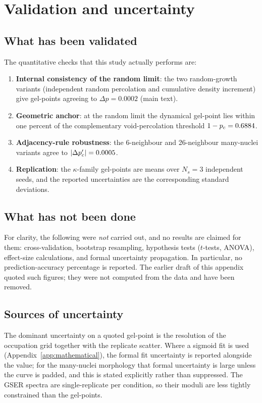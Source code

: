 \section{Validation and uncertainty}
\label{app:validation}

\subsection{What has been validated}

The quantitative checks that this study actually performs are:

\begin{enumerate}
    \item \textbf{Internal consistency of the random limit}: the two random-growth variants (independent random percolation and cumulative density increment) give gel-points agreeing to $\Delta p = 0.0002$ (main text).
    \item \textbf{Geometric anchor}: at the random limit the dynamical gel-point lies within one percent of the complementary void-percolation threshold $1 - p_c = 0.6884$.
    \item \textbf{Adjacency-rule robustness}: the 6-neighbour and 26-neighbour many-nuclei variants agree to $|\Delta p_c'| = 0.0005$.
    \item \textbf{Replication}: the $\kappa$-family gel-points are means over $N_s = 3$ independent seeds, and the reported uncertainties are the corresponding standard deviations.
\end{enumerate}

\subsection{What has not been done}

For clarity, the following were \emph{not} carried out, and no results are claimed for them: cross-validation, bootstrap resampling, hypothesis tests ($t$-tests, ANOVA), effect-size calculations, and formal uncertainty propagation. In particular, no prediction-accuracy percentage is reported. The earlier draft of this appendix quoted such figures; they were not computed from the data and have been removed.

\subsection{Sources of uncertainty}

The dominant uncertainty on a quoted gel-point is the resolution of the occupation grid together with the replicate scatter. Where a sigmoid fit is used (Appendix~\ref{app:mathematical}), the formal fit uncertainty is reported alongside the value; for the many-nuclei morphology that formal uncertainty is large unless the curve is padded, and this is stated explicitly rather than suppressed. The GSER spectra are single-replicate per condition, so their moduli are less tightly constrained than the gel-points.
